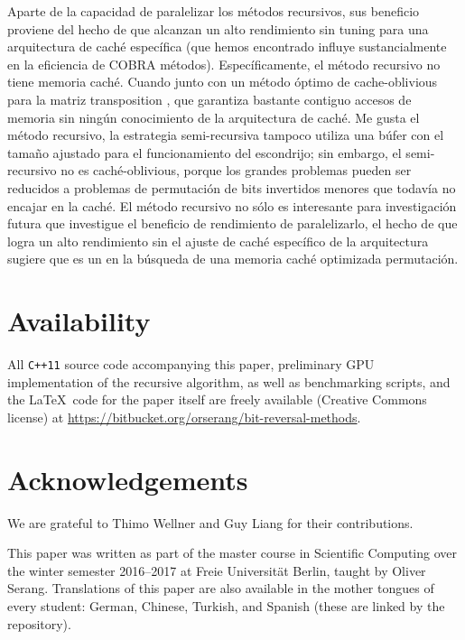 ﻿\documentclass[10pt]{article}
\begin{document}
{{Aparte de la capacidad de paralelizar los métodos recursivos, sus beneficio proviene del hecho de que alcanzan un alto rendimiento sin tuning para una arquitectura de caché específica (que hemos encontrado influye sustancialmente en la eficiencia de COBRA métodos). Específicamente, el método recursivo no tiene memoria caché. Cuando junto con un método óptimo de cache-oblivious para la matriz transposition \cite{prokop: cache}, que garantiza bastante contiguo accesos de memoria sin ningún conocimiento de la arquitectura de caché. Me gusta el método recursivo, la estrategia semi-recursiva tampoco utiliza una búfer con el tamaño ajustado para el funcionamiento del escondrijo; sin embargo, el semi-recursivo no es caché-oblivious, porque los grandes problemas pueden ser reducidos a problemas de permutación de bits invertidos menores que todavía no encajar en la caché. El método recursivo no sólo es interesante para investigación futura que investigue el beneficio de rendimiento de paralelizarlo, el hecho de que logra un alto rendimiento sin el ajuste de caché específico de la arquitectura sugiere que es un en la búsqueda de una memoria caché optimizada
permutación.
\section*{Availability}
All {\tt C++11} source code accompanying this paper, preliminary GPU
implementation of the recursive algorithm, as well as benchmarking
scripts, and the \LaTeX\ code for the paper itself are freely
available (Creative Commons license) at
\url{https://bitbucket.org/orserang/bit-reversal-methods}.\newline

\section*{Acknowledgements}

We are grateful to Thimo Wellner and Guy Liang for their
contributions.\newline 

\noindent This paper was written as part of the master course in
Scientific Computing over the winter semester 2016--2017 at Freie
Universit\"at Berlin, taught by Oliver Serang. Translations of this
paper are also available in the mother tongues of every student:
German, Chinese, Turkish, and Spanish (these are linked by the
repository). %

}}
\end{document}
